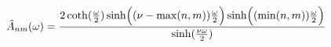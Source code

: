 \begin{equation}
\hat A_{nm}(\omega)={2 \coth ({\omega \over 2} )\sinh \Bigl (( \nu
- \max(n,m)){\omega \over 2}\Bigr) \sinh \Bigl ((\min(n,m)){\omega
\over 2}\Bigr ) \over \sinh ({\nu \omega \over 2})} \label{A}
\end{equation}

